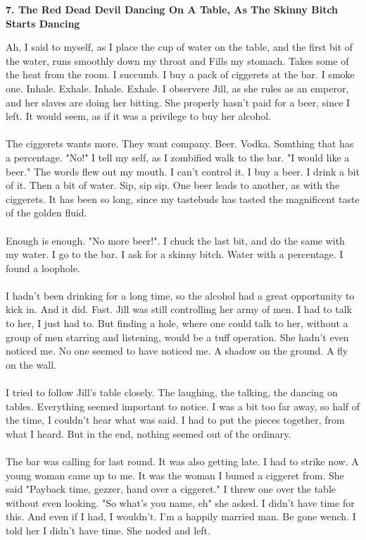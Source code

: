 \documentclass[]{article}
\begin{document}
\newpage

\begin{center}
	\large\textbf{7. The Red Dead Devil Dancing On A Table, \newline As The Skinny Bitch Starts Dancing}
\end{center}

Ah, I said to myself, as I place the cup of water on the table, and the first bit of the water, runs smoothly down my throat and Fills my stomach. Takes some of the heat from the room. I succumb. I buy a pack of ciggerets at the bar. I smoke one. Inhale. Exhale. Inhale. Exhale. I observere Jill, as she rules as an emperor, and her slaves are doing her bitting. She properly hasn't paid for a beer, since I left. It would seem, as if it was a privilege to buy her alcohol.
\\ \\
The ciggerets wants more. They want company. Beer. Vodka. Somthing that has a percentage. "No!" I tell my self, as I zombified walk to the bar. "I would like a beer." The words flew out my mouth. I can't control it. I buy a beer. I drink a bit of it. Then a bit of water. Sip, sip sip. One beer leads to another, as with the ciggerets. It has been so long, since my tastebuds has tasted the magnificent taste of the golden fluid. 
\\ \\
Enough is enough. "No more beer!". I chuck the last bit, and do the same with my water. I go to the bar. I ask for a skinny bitch. Water with a percentage. I found a loophole.
\\ \\
I hadn't been drinking for a long time, so the alcohol had a great opportunity to kick in. And it did. Fast. Jill was still controlling her army of men. I had to talk to her, I just had to. But finding a hole, where one could talk to her, without a group of men starring and listening, would be a tuff operation. She hadn't even noticed me. No one seemed to have noticed me. A shadow on the ground. A fly on the wall.
\\ \\
I tried to follow Jill's table closely. The laughing, the talking, the dancing on tables. Everything seemed important to notice. I was a bit too far away, so half of the time, I couldn't hear what was said. I had to put the pieces together, from what I heard. But in the end, nothing seemed out of the ordinary.
\\ \\
The bar was calling for last round. It was also getting late. I had to strike now. A young woman came up to me. It was the woman I bumed a ciggeret from. She said "Payback time, gezzer, hand over a ciggeret." I threw one over the table without even looking. "So what's you name, eh" she asked. I didn't have time for this. And even if I had, I wouldn't. I'm a happily married man. Be gone wench. I told her I didn't have time. She noded and left.
\end{document}
